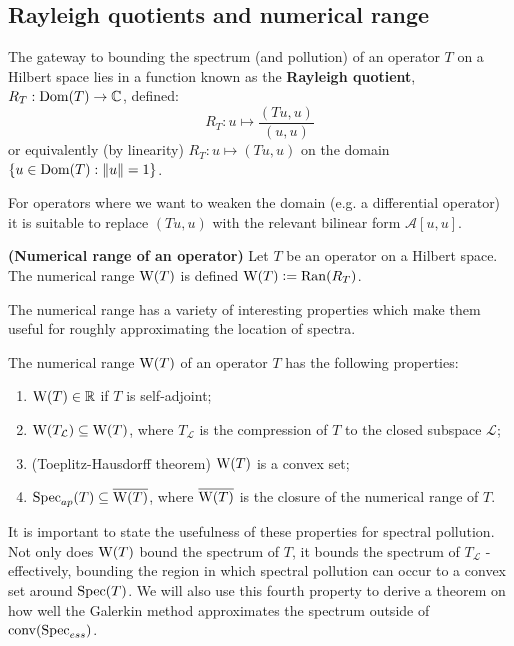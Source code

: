 \documentclass[../main.tex]{subfiles}
\begin{document}
\subsection{Rayleigh quotients and numerical range}
The gateway to bounding the spectrum (and pollution) of an operator $T$ on a
Hilbert space lies in a function known as the \textbf{Rayleigh
quotient}, $R_T: \mathrm{Dom}(T) \rightarrow \mathbb{C}$,
defined:
\begin{equation*}
  R_T: u \mapsto \frac{( Tu, u )}{(u, u)}
\end{equation*} 
or equivalently (by linearity) $R_T: u \mapsto (Tu, u)$ on the domain $\{u \in
\mathrm{Dom}(T) : \|u\| = 1\}$.
 
For operators where we want to weaken the domain (e.g. a differential operator)
it is suitable to replace $(Tu, u)$ with the relevant bilinear form
$\mathcal{A}[u, u].$

\begin{definition}{\textbf{(Numerical range of an operator)}}
  Let $T$ be an operator on a Hilbert space. The
  numerical range $\mathrm{W}(T)$ is defined $\mathrm{W}(T) \mathrel{\mathop:}= \mathrm{Ran}(R_T)$.
\end{definition}

The numerical range has a variety of interesting properties which make them
useful for roughly approximating the location of spectra.

\begin{proposition}
\label{thm:num-range-props}
  The numerical range $\mathrm{W}(T)$ of an operator $T$ has the following properties:
  \begin{enumerate}
    \item
    \label{item:num-in-R}
	$\mathrm{W}(T) \in \mathbb{R}$ if $T$ is self-adjoint;
    \item
    \label{item:proj-num-range} 
	$\mathrm{W}(T_\mathcal{L}) \subseteq \mathrm{W}(T)$, where $T_\mathcal{L}$ is the compression of $T$ to the closed subspace $\mathcal{L}$;
    \item (Toeplitz-Hausdorff theorem)
    \label{item:toeplitz-hausdorff}
      $\mathrm{W}(T)$ is a convex set;
    \item
    \label{item:spec-in-num} 
      $\mathrm{Spec}_{ap}(T) \subseteq \overline{\mathrm{W}(T)}$,
     where $\overline{\mathrm{W}(T)}$ is the closure of the numerical range of $T$.
  \end{enumerate}
\end{proposition}

It is important to state the usefulness of these properties for spectral
pollution. Not only does $\mathrm{W}(T)$ bound the spectrum of $T$, it bounds the
spectrum of $T_\mathcal{L}$ - effectively, bounding the region in which spectral
pollution can occur to a convex set around $\mathrm{Spec}(T)$.
We will also use this fourth property to derive a theorem on how well the
Galerkin method approximates the spectrum outside of $\mathrm{conv}(\mathrm{Spec}_{ess})$.
\end{document}
